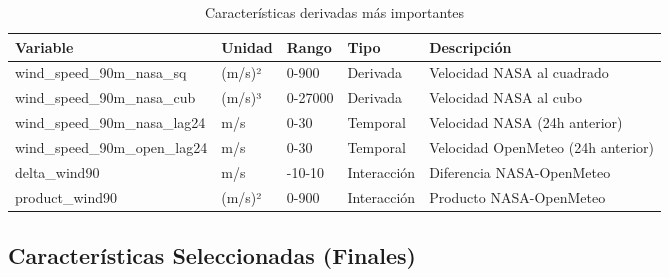 \documentclass[conference]{IEEEtran}
\begin{document}
	\begin{table}[htbp]
		\centering
		\caption{Características derivadas más importantes}
		\begin{tabular}{|p{2.5cm}|p{1.2cm}|p{1.4cm}|p{1.2cm}|p{3.5cm}|}
			\hline
			\textbf{Variable} & \textbf{Unidad} & \textbf{Rango} & \textbf{Tipo} & \textbf{Descripción} \\
			\hline
			wind\_speed\_90m\_nasa\_sq & (m/s)² & 0-900 & Derivada & Velocidad NASA al cuadrado \\
			\hline
			wind\_speed\_90m\_nasa\_cub & (m/s)³ & 0-27000 & Derivada & Velocidad NASA al cubo \\
			\hline
			wind\_speed\_90m\_nasa\_lag24 & m/s & 0-30 & Temporal & Velocidad NASA (24h anterior) \\
			\hline
			wind\_speed\_90m\_open\_lag24 & m/s & 0-30 & Temporal & Velocidad OpenMeteo (24h anterior) \\
			\hline
			delta\_wind90 & m/s & -10-10 & Interacción & Diferencia NASA-OpenMeteo \\
			\hline
			product\_wind90 & (m/s)² & 0-900 & Interacción & Producto NASA-OpenMeteo \\
			\hline
		\end{tabular}
		\label{tab:derived_features}
	\end{table}
	
	\vspace{0.5cm}
	
	\subsection{Características Seleccionadas (Finales)}
	
\end{document}
